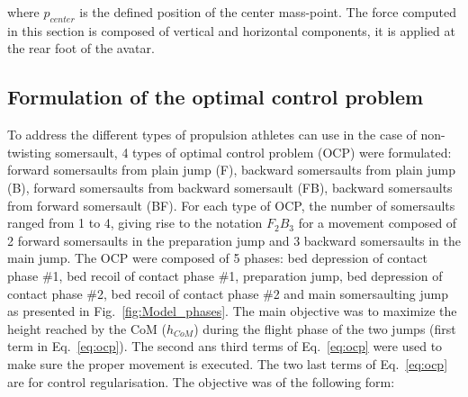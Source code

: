 \noindent where $p_{center}$ is the defined position of the center mass-point.
The force computed in this section is composed of vertical and horizontal components, it is applied at the rear foot of the avatar.



\subsection{Formulation of the optimal control problem}\label{subsec:2e}
To address the different types of propulsion athletes can use in the case of non-twisting somersault, 4 types of optimal control problem (OCP) were formulated: forward somersaults from plain jump (F), backward somersaults from plain jump (B), forward somersaults from backward somersault (FB), backward somersaults from forward somersault (BF).
For each type of OCP, the number of somersaults ranged from 1 to 4, giving rise to the notation $F_2B_3$ for a movement composed of 2 forward somersaults in the preparation jump and 3 backward somersaults in the main jump.
The OCP were composed of 5 phases: bed depression of contact phase \#1, bed recoil of contact phase \#1, preparation jump, bed depression of contact phase \#2, bed recoil of contact phase \#2 and main somersaulting jump as presented in Fig.~\ref{fig:Model_phases}.
The main objective was to maximize the height reached by the CoM ($h_{CoM}$) during the flight phase of the two jumps (first term in Eq.~\ref{eq:ocp}).
The second ans third terms of Eq.~\ref{eq:ocp} were used to make sure the proper movement is executed.
The two last terms of Eq.~\ref{eq:ocp} are for control regularisation.
The objective was of the following form:

